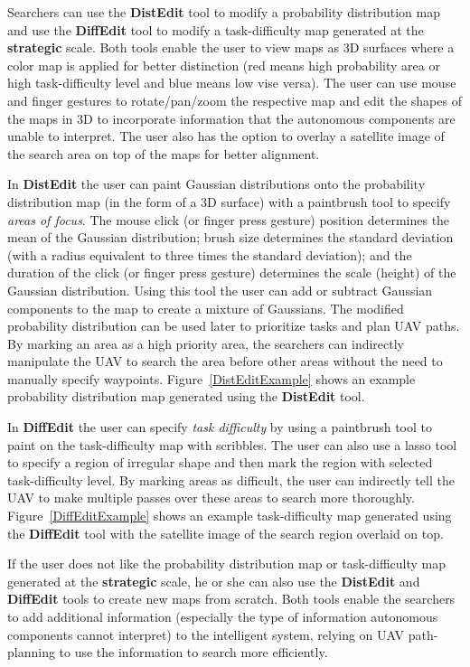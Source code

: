 Searchers can use the \textbf{DistEdit} tool to modify a probability distribution map and use the \textbf{DiffEdit} tool to modify a task-difficulty map generated at the \textbf{strategic} scale. Both tools enable the user to view maps as 3D surfaces where a color map is applied for better distinction (red means high probability area or high task-difficulty level and blue means low vise versa). The user can use mouse and finger gestures to rotate/pan/zoom the respective map and edit the shapes of the maps in 3D to incorporate information that the autonomous components are unable to interpret. The user also has the option to overlay a satellite image of the search area on top of the maps for better alignment.

In \textbf{DistEdit} the user can paint Gaussian distributions onto the probability distribution map (in the form of a 3D surface) with a paintbrush tool to specify \textit{areas of focus}. The mouse click (or finger press gesture) position determines the mean of the Gaussian distribution; brush size determines the standard deviation (with a radius equivalent to three times the standard deviation); and the duration of the click (or finger press gesture) determines the scale (height) of the Gaussian distribution. Using this tool the user can add or subtract Gaussian components to the map to create a mixture of Gaussians. The modified probability distribution can be used later to prioritize tasks and plan UAV paths. By marking an area as a high priority area, the searchers can indirectly manipulate the UAV to search the area before other areas without the need to manually specify waypoints. Figure~\ref{DistEditExample} shows an example probability distribution map generated using the \textbf{DistEdit} tool.

In \textbf{DiffEdit} the user can specify \textit{task difficulty} by using a paintbrush tool to paint on the task-difficulty map with scribbles. The user can also use a lasso tool to specify a region of irregular shape and then mark the region with selected task-difficulty level. By marking areas as difficult, the user can indirectly tell the UAV to make multiple passes over these areas to search more thoroughly. Figure~\ref{DiffEditExample} shows an example task-difficulty map generated using the \textbf{DiffEdit} tool with the satellite image of the search region overlaid on top.

If the user does not like the probability distribution map or task-difficulty map generated at the \textbf{strategic} scale, he or she can also use the \textbf{DistEdit} and \textbf{DiffEdit} tools to create new maps from scratch. Both tools enable the searchers to add additional information (especially the type of information autonomous components cannot interpret) to the intelligent system, relying on UAV path-planning to use the information to search more efficiently.

